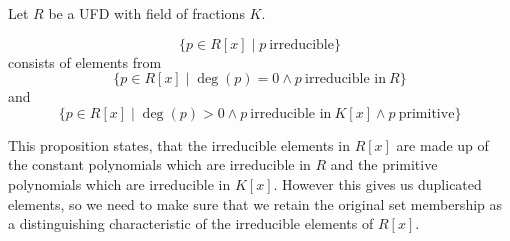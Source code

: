 \begin{proposition}
   Let \(R\) be a UFD with field of fractions \(K\).

   \[\{p \in R[x] \mid p~\text{irreducible}\}\]
   consists of elements from
   \[\{p \in R[x] \mid \deg(p) = 0 \land p~\text{irreducible in}~R\}\]
   and
   \[\{p \in R[x] \mid \deg(p) > 0 \land p~\text{irreducible in}~K[x] \land p~\text{primitive}\}\]
\end{proposition}
\begin{remark}
   This proposition states, that the irreducible elements in \(R[x]\) are made up of the constant polynomials which are irreducible in \(R\) and the primitive polynomials which are irreducible in \(K[x]\).
   However this gives us duplicated elements, so we need to make sure that we retain the original set membership as a distinguishing characteristic of the irreducible elements of \(R[x]\).
\end{remark}

